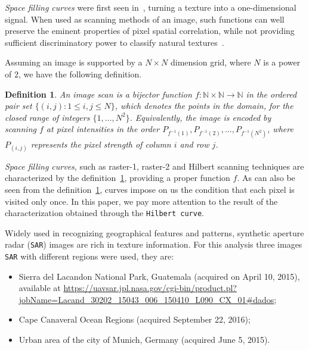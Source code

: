 \documentclass{isprs}
\begin{document}
	\textit{Space filling curves} were first seen in~\cite{Nguyen1982SpaceFC}, turning a texture into a one-dimensional signal.
	When used as scanning methods of an image, such functions can well preserve the eminent properties of pixel spatial correlation, while not providing sufficient discriminatory power to classify natural textures~\citep{Lee1994Texture}.
	
	Assuming an image is supported by a $N \times N$ dimension grid, where $N$ is a power of $2$, we have the following definition.
	
	\newtheorem{mydef}{Definition}
	\begin{mydef}
		An image scan is a bijector function $f \colon \mathbb{N} \times \mathbb{N} \to \mathbb{N}$ in the ordered pair set $ \{(i, j): 1 \leq i , j \leq N \}$, which denotes the points in the domain, for the closed range of integers $\{1, \dots, N^2\}$. Equivalently, the image is encoded by scanning $ f $ at pixel intensities in the order $P_{f^{-1}(1)}, P_{f^{-1}(2)}, \dots, P_{f^{-1}(N^2)}$, where $P_{(i, j)}$ represents the pixel strength of column $i$ and row $j$.
		\label{def:CurveFilling}
	\end{mydef}
	
	\textit{Space filling curves}, such as raster-1, raster-2 and Hilbert scanning techniques are characterized by the definition~\ref{def:CurveFilling}, providing a proper function $f$.
	As can also be seen from the definition~\ref{def:CurveFilling}, curves impose on us the condition that each pixel is visited only once.
	In this paper, we pay more attention to the result of the characterization obtained through the \texttt{Hilbert curve}.
	
	Widely used in recognizing geographical features and patterns, synthetic aperture radar (\texttt{SAR}) images are rich in texture information. For this analysis three images \texttt{SAR} with different regions were used, they are:
	
	\begin{itemize}
		\item Sierra del Lacandon National Park, Guatemala (acquired on April 10, 2015), available at \url{https://uavsar.jpl.nasa.gov/cgi-bin/product.pl?jobName=Lacand_30202_15043_006_150410_L090_CX_01#dados};
		\item Cape Canaveral Ocean Regions (acquired September 22, 2016);
		\item Urban area of the city of Munich, Germany (acquired June 5, 2015).
	\end{itemize}
	
\end{document}

